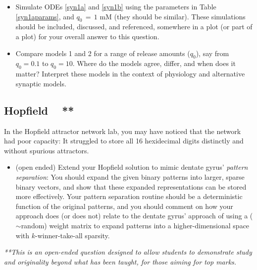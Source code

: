 \documentclass[11pt]{article}
\begin{document}
\vspace{-\baselineskip}
\begin{itemize}
\item[\textbf{(i)}] Simulate ODEs \eqref{syn1a} and \eqref{syn1b} using the parameters in Table \ref{syn1aparams}, and $q_0\,{=}\,1$ mM (they should be similar). These simulations should be included, discussed, and referenced, somewhere in a plot (or part of a plot) for your overall answer to this question.
\item[\textbf{(ii)}] 
Compare models 1 and 2 for a range of release amounts ($q_0$), say from $q_0{=}0.1$ to $q_0{=}10$. Where do the models agree, differ, and when does it matter? Interpret these models in the context of physiology and alternative synaptic models.
\end{itemize}


\clearpage
\subsection{Hopfield ~ **}

In the Hopfield attractor network lab, you may have noticed that the network had poor capacity: It struggled to store all 16 hexidecimal digits distinctly and without spurious attractors.%
\begin{itemize}
\item[\textbf{(i)}] (open ended) Extend your Hopfield solution to mimic dentate gyrus' \textit{pattern separation}:
You should expand the given binary patterns into larger, sparse binary vectors, and show that these expanded representations can be stored more effectively. Your pattern separation routine should be a deterministic function of the original patterns, and you should comment on how your approach does (or does not) relate to the dentate gyrus' approach of using a ($\sim$random) weight matrix to expand patterns into a higher-dimensional space with $k$-winner-take-all sparsity.
\end{itemize}
\textit{**This is an open-ended question designed to allow students to demonstrate study and originality beyond what has been taught, for those aiming for top marks.}
\end{document}
